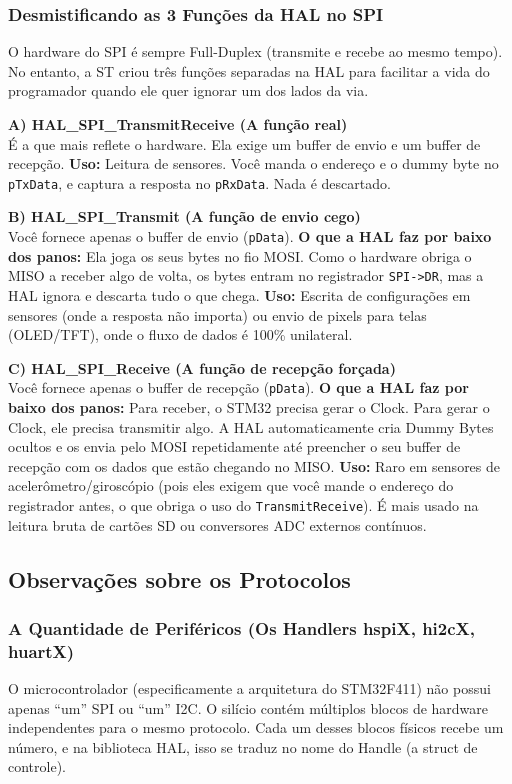 \documentclass[12pt,a4paper]{article}
\begin{document}
\subsubsection{Desmistificando as 3 Funções da HAL no SPI}
O hardware do SPI é sempre Full-Duplex (transmite e recebe ao mesmo tempo). No entanto, a ST criou três funções separadas na HAL para facilitar a vida do programador quando ele quer ignorar um dos lados da via.

\textbf{A) HAL\_SPI\_TransmitReceive (A função real)}\\
É a que mais reflete o hardware. Ela exige um buffer de envio e um buffer de recepção.
\textbf{Uso:} Leitura de sensores. Você manda o endereço e o dummy byte no \texttt{pTxData}, e captura a resposta no \texttt{pRxData}. Nada é descartado.

\textbf{B) HAL\_SPI\_Transmit (A função de envio cego)}\\
Você fornece apenas o buffer de envio (\texttt{pData}).
\textbf{O que a HAL faz por baixo dos panos:} Ela joga os seus bytes no fio MOSI. Como o hardware obriga o MISO a receber algo de volta, os bytes entram no registrador \texttt{SPI->DR}, mas a HAL ignora e descarta tudo o que chega.
\textbf{Uso:} Escrita de configurações em sensores (onde a resposta não importa) ou envio de pixels para telas (OLED/TFT), onde o fluxo de dados é 100\% unilateral.

\textbf{C) HAL\_SPI\_Receive (A função de recepção forçada)}\\
Você fornece apenas o buffer de recepção (\texttt{pData}).
\textbf{O que a HAL faz por baixo dos panos:} Para receber, o STM32 precisa gerar o Clock. Para gerar o Clock, ele precisa transmitir algo. A HAL automaticamente cria Dummy Bytes ocultos e os envia pelo MOSI repetidamente até preencher o seu buffer de recepção com os dados que estão chegando no MISO.
\textbf{Uso:} Raro em sensores de acelerômetro/giroscópio (pois eles exigem que você mande o endereço do registrador antes, o que obriga o uso do \texttt{TransmitReceive}). É mais usado na leitura bruta de cartões SD ou conversores ADC externos contínuos.

\newpage
\subsection{Observações sobre os Protocolos}

\subsubsection{A Quantidade de Periféricos (Os Handlers hspiX, hi2cX, huartX)}
O microcontrolador (especificamente a arquitetura do STM32F411) não possui apenas ``um'' SPI ou ``um'' I2C. O silício contém múltiplos blocos de hardware independentes para o mesmo protocolo.
Cada um desses blocos físicos recebe um número, e na biblioteca HAL, isso se traduz no nome do Handle (a struct de controle).
\end{document}
